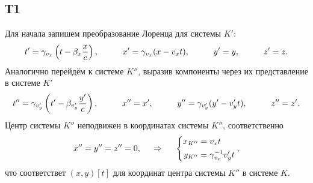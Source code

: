 \subsection*{Т1}
Для начала запишем преобразование Лоренца для системы $K'$:
\begin{equation*}
    t' = \gamma_{v_x} \left(t - \beta_x \frac{x}{c}\right)
    , \hspace{1 cm}
    x' = \gamma_{v_x} (x - v_x t)
    , \hspace{1 cm}
    y' = y
    , \hspace{1 cm}
    z' = z.
\end{equation*}
Аналогично перейдём к системе $K''$, выразив компоненты через их представление в системе $K'$
\begin{equation*}
    t'' = \gamma_{v_y'} \left(t' - \beta_{v_y'} \frac{y'}{c}\right),
    \hspace{1 cm}
    x'' = x', 
    \hspace{1 cm}
    y'' = \gamma_{v_y'} (y' - v_y' t),
    \hspace{1 cm}
    z'' = z'.
\end{equation*}
Центр системы $K''$ неподвижен в координатах системы $K''$, соответственно
\begin{equation*}
    x'' = y'' = z'' = 0,
    \hspace{0.5cm} \Rightarrow \hspace{0.5cm}
    \left\{\begin{aligned}
        x_{K''} &= v_x  t\\
        y_{K''} &= \gamma_{v_x}^{-1} v_y' t  
    \end{aligned}\right.
    ,
\end{equation*}
что соответствет $(x, y)[t]$ для координат центра системы $K''$ в системе $K$.

